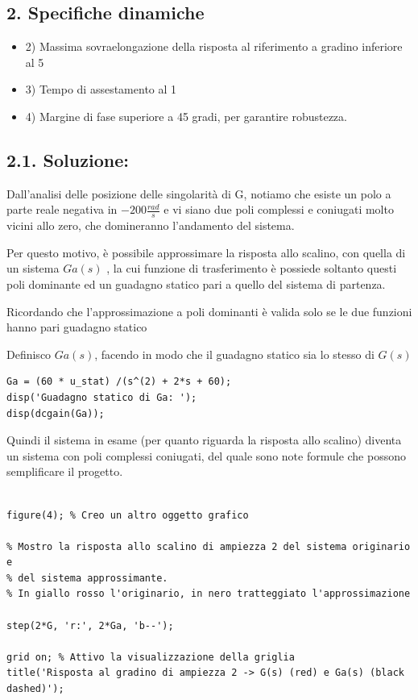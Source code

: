 \documentclass{article}
\begin{document}
\subsection*{2. Specifiche dinamiche}

\begin{par}
\begin{itemize}
\setlength{\itemsep}{-1ex}
   \item 2) Massima sovraelongazione della risposta al riferimento a gradino inferiore al 5%
   \item 3) Tempo di assestamento al 1%
   \item 4) Margine di fase superiore a 45 gradi, per garantire robustezza.
\end{itemize}
\end{par}


\subsection*{2.1. Soluzione:}

\begin{par}
Dall'analisi delle posizione delle singolarità di G, notiamo che esiste un polo a
parte reale negativa in $ -200 \frac{rad}{s} $ e vi siano due poli complessi e coniugati molto vicini allo zero, che domineranno
l'andamento del sistema.

Per questo motivo, è possibile approssimare la risposta allo scalino,
con quella di un sistema $ Ga(s) $ , la cui funzione di trasferimento è
possiede soltanto questi poli dominante ed un guadagno statico pari a quello
del sistema di partenza.

Ricordando che l'approssimazione a poli dominanti è valida solo se le due
funzioni hanno pari guadagno statico

Definisco $ Ga(s) $, facendo in modo che il guadagno statico sia lo
stesso di $ G(s) $
\end{par}
\begin{verbatim}
Ga = (60 * u_stat) /(s^(2) + 2*s + 60);
disp('Guadagno statico di Ga: ');
disp(dcgain(Ga));
\end{verbatim}

\begin{par}

Quindi il sistema in esame (per quanto riguarda la risposta allo scalino) diventa un sistema con poli complessi coniugati, del quale sono note formule che possono semplificare il progetto.

\end{par}
\begin{verbatim}

figure(4); % Creo un altro oggetto grafico

% Mostro la risposta allo scalino di ampiezza 2 del sistema originario e
% del sistema approssimante.
% In giallo rosso l'originario, in nero tratteggiato l'approssimazione

step(2*G, 'r:', 2*Ga, 'b--');

grid on; % Attivo la visualizzazione della griglia
title('Risposta al gradino di ampiezza 2 -> G(s) (red) e Ga(s) (black dashed)');
\end{verbatim}
\end{document}
